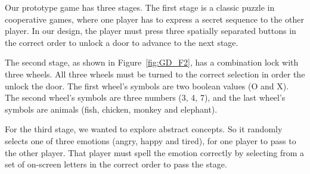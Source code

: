 


Our prototype game has three stages. The first stage is a classic puzzle in cooperative games, where one player has to express a secret sequence to the other player. In our design, the player must press three spatially separated buttons in the correct order to unlock a door to advance to the next stage.


The second stage, as shown in Figure~\ref{fig:GD_F2}, has a combination lock with three wheels. All three wheels must be turned to the correct selection in order the unlock the door. The first wheel's symbols are two boolean values (O and X). The second wheel's symbols are three numbers (3, 4, 7), and the last wheel's symbols are animals (fish, chicken, monkey and elephant).


For the third stage, we wanted to explore abstract concepts. So it randomly selects one of three emotions (angry, happy and tired), for one player to pass to the other player. That player must spell the emotion correctly by selecting from a set of on-screen letters in the correct order to pass the stage.




